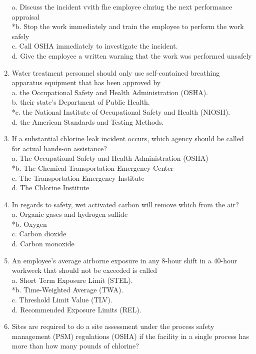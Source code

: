 \begin{enumerate}[1.]
a.	Discuss the incident vvith fhe employee clnriug the next performance appraisal\\
*b.	Stop the work immediately and train the employee to perform the work safely\\
c.	Call OSHA immediately to investigate the incident. \\
d.	Give the employee a written warning that the work was performed unsafely\\
\item Water treatment personnel should only use self-contained breathing apparatus equipment that has been approved by\\
a. the Occupational Safety and Health Administration (OSHA).\\
b. their state's Department of Public Health.\\
*c. the National Institute of Occupational Safety and Health (NIOSH).\\
d. the American Standards and Testing Methods.\\
\item If a substantial chlorine leak incident occurs, which agency should be called for actual hands-on assistance?\\
a. The Occupational Safety and Health Administration (OSHA)\\
*b. The Chemical Transportation Emergency Center\\
c. The Transportation Emergency Institute\\
d. The Chlorine Institute\\
\item In regards to safety, wet activated carbon will remove which from the air?\\
a. Organic gases and hydrogen sulfide\\
*b. Oxygen\\
c. Carbon dioxide\\
d. Carbon monoxide\\
\item An employee's average airborne exposure in any 8-hour shift in a 40-hour workweek that should not be exceeded is called\\
a. Short Term Exposure Limit (STEL).\\
*b. Time-Weighted Average (TWA).\\
c. Threshold Limit Value (TLV).\\
d. Recommended Exposure Limits (REL).\\
\item Sites are required to do a site assessment under the process safety management (PSM) regulations (OSHA) if the facility in a single process has more than how many pounds of chlorine?\\

\end{enumerate}
